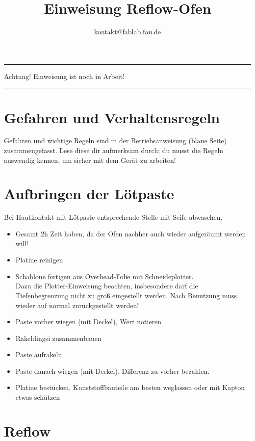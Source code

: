 \documentclass{\basedir/fablab-document}
\author{kontakt@fablab.fau.de}
\title{Einweisung Reflow-Ofen}
\begin{document}
\color{red}
\hrule
\begin{center}
\large{Achtung! Einweisung ist noch in Arbeit!}
\vspace{0.1cm}
\end{center}
\hrule
\color{black}
\tableofcontents

\section{Gefahren und Verhaltensregeln}
Gefahren und wichtige Regeln sind in der Betriebsanweisung (blaue Seite) zusammengefasst. Lese diese dir aufmerksam durch; du musst die Regeln auswendig kennen, um sicher mit dem Gerät zu arbeiten!


\section{Aufbringen der Lötpaste}
Bei Hautkontakt mit Lötpaste entsprechende Stelle mit Seife abwaschen. 

\begin{itemize}
\item Gesamt 2h Zeit haben, da der Ofen nachher auch wieder aufgeräumt werden will!
\item Platine reinigen
\item Schablone fertigen aus Overhead-Folie mit Schneideplotter. \\ Dazu die Plotter-Einweisung beachten, insbesondere darf die Tiefenbegrenzung nicht zu groß eingestellt werden. Nach Benutzung muss wieder auf normal zurückgestellt werden!
\item Paste vorher wiegen (mit Deckel), Wert notieren
\item Rakeldingsi zusammenbauen
\item Paste aufrakeln
\item Paste danach wiegen (mit Deckel), Differenz zu vorher bezahlen.
\item Platine bestücken, Kunststoffbauteile am besten weglassen oder mit Kapton etwas schützen
\end{itemize}


\section{Reflow}
\end{document}
